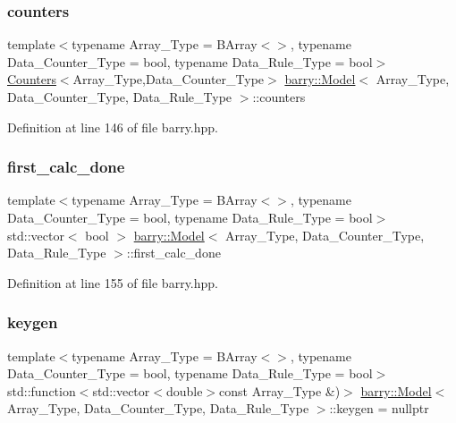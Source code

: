 \subsubsection{\texorpdfstring{counters}{counters}}
{\footnotesize\ttfamily template$<$typename Array\+\_\+\+Type  = B\+Array$<$$>$, typename Data\+\_\+\+Counter\+\_\+\+Type  = bool, typename Data\+\_\+\+Rule\+\_\+\+Type  = bool$>$ \\
\hyperlink{classbarry_1_1_counters}{Counters}$<$Array\+\_\+\+Type,Data\+\_\+\+Counter\+\_\+\+Type$>$ \hyperlink{classbarry_1_1_model}{barry\+::\+Model}$<$ Array\+\_\+\+Type, Data\+\_\+\+Counter\+\_\+\+Type, Data\+\_\+\+Rule\+\_\+\+Type $>$\+::counters}



Definition at line 146 of file barry.\+hpp.

\mbox{\label{classbarry_1_1_model_ae7b6def02fcb353830362713490c9825}} 
\subsubsection{\texorpdfstring{first\+\_\+calc\+\_\+done}{first\_calc\_done}}
{\footnotesize\ttfamily template$<$typename Array\+\_\+\+Type  = B\+Array$<$$>$, typename Data\+\_\+\+Counter\+\_\+\+Type  = bool, typename Data\+\_\+\+Rule\+\_\+\+Type  = bool$>$ \\
std\+::vector$<$ bool $>$ \hyperlink{classbarry_1_1_model}{barry\+::\+Model}$<$ Array\+\_\+\+Type, Data\+\_\+\+Counter\+\_\+\+Type, Data\+\_\+\+Rule\+\_\+\+Type $>$\+::first\+\_\+calc\+\_\+done}



Definition at line 155 of file barry.\+hpp.

\mbox{\label{classbarry_1_1_model_a68f7422006423a4f0a00c3e4f5d0e1d5}} 
\subsubsection{\texorpdfstring{keygen}{keygen}}
{\footnotesize\ttfamily template$<$typename Array\+\_\+\+Type  = B\+Array$<$$>$, typename Data\+\_\+\+Counter\+\_\+\+Type  = bool, typename Data\+\_\+\+Rule\+\_\+\+Type  = bool$>$ \\
std\+::function$<$std\+::vector$<$double$>$const Array\+\_\+\+Type \&)$>$ \hyperlink{classbarry_1_1_model}{barry\+::\+Model}$<$ Array\+\_\+\+Type, Data\+\_\+\+Counter\+\_\+\+Type, Data\+\_\+\+Rule\+\_\+\+Type $>$\+::keygen = nullptr}



